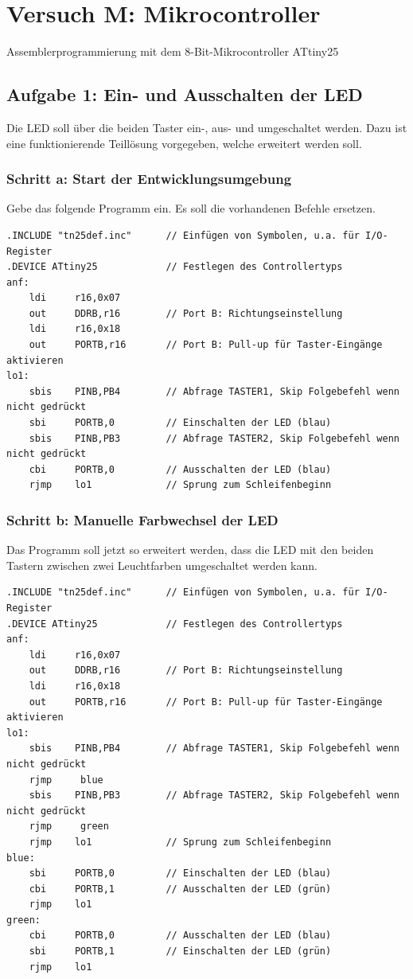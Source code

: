 \documentclass[a4paper,12pt,titlepage]{scrartcl}
\begin{document}
\newpage
\section*{Versuch M: Mikrocontroller}
Assemblerprogrammierung mit dem 8-Bit-Mikrocontroller ATtiny25

\subsection*{Aufgabe 1: Ein- und Ausschalten der LED}
Die LED soll über die beiden Taster ein-, aus- und umgeschaltet werden. Dazu ist eine funktionierende Teillösung vorgegeben, welche erweitert werden soll.

\subsubsection*{Schritt a: Start der Entwicklungsumgebung}
Gebe das folgende Programm ein. Es soll die vorhandenen Befehle ersetzen.
\begin{lstlisting}[basicstyle=\tiny]
.INCLUDE "tn25def.inc"      // Einfügen von Symbolen, u.a. für I/O-Register
.DEVICE ATtiny25            // Festlegen des Controllertyps
anf:
    ldi     r16,0x07
    out     DDRB,r16        // Port B: Richtungseinstellung
    ldi     r16,0x18
    out     PORTB,r16       // Port B: Pull-up für Taster-Eingänge aktivieren
lo1:
    sbis    PINB,PB4        // Abfrage TASTER1, Skip Folgebefehl wenn nicht gedrückt
    sbi     PORTB,0         // Einschalten der LED (blau)
    sbis    PINB,PB3        // Abfrage TASTER2, Skip Folgebefehl wenn nicht gedrückt
    cbi     PORTB,0         // Ausschalten der LED (blau)
    rjmp    lo1             // Sprung zum Schleifenbeginn
\end{lstlisting}

\subsubsection*{Schritt b: Manuelle Farbwechsel der LED}
Das Programm soll jetzt so erweitert werden, dass die LED mit den beiden Tastern zwischen zwei Leuchtfarben umgeschaltet werden kann.
\begin{lstlisting}[basicstyle=\tiny]
.INCLUDE "tn25def.inc"      // Einfügen von Symbolen, u.a. für I/O-Register
.DEVICE ATtiny25            // Festlegen des Controllertyps
anf:
    ldi     r16,0x07
    out     DDRB,r16        // Port B: Richtungseinstellung
    ldi     r16,0x18
    out     PORTB,r16       // Port B: Pull-up für Taster-Eingänge aktivieren
lo1:
    sbis    PINB,PB4        // Abfrage TASTER1, Skip Folgebefehl wenn nicht gedrückt
    rjmp     blue
    sbis    PINB,PB3        // Abfrage TASTER2, Skip Folgebefehl wenn nicht gedrückt
    rjmp     green
    rjmp    lo1             // Sprung zum Schleifenbeginn
blue:
    sbi     PORTB,0         // Einschalten der LED (blau)
    cbi     PORTB,1         // Ausschalten der LED (grün)
    rjmp    lo1
green:
    cbi     PORTB,0         // Ausschalten der LED (blau)
    sbi     PORTB,1         // Einschalten der LED (grün)
    rjmp    lo1
\end{lstlisting}
\end{document}
